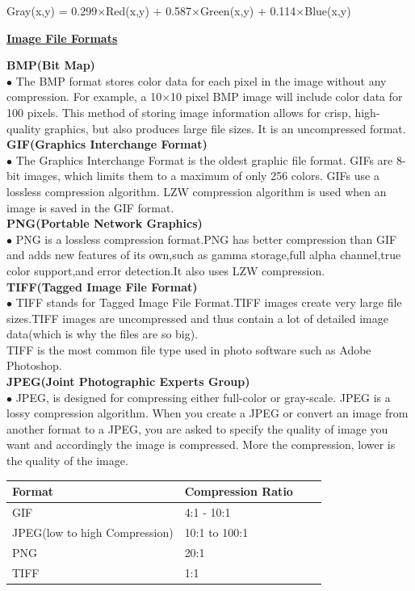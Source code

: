 \documentclass[10pt,a4paper]{article}
\begin{document}
Gray(x,y) = 0.299$\times$Red(x,y) + 0.587$\times$Green(x,y) + 0.114$\times$Blue(x,y)
\begin{center}
\underline{\textbf{Image File Formats}} 
\end{center}
\textbf{BMP(Bit Map)}\\
$\bullet$ The BMP format stores color data for each pixel in the image without any compression. For example, a 10$\times$10 pixel BMP image will include color data for 100 pixels. This method of storing image information allows for crisp, high-quality graphics, but also produces large file sizes.
It is an uncompressed format.\\
\textbf{GIF(Graphics Interchange Format)}\\
$\bullet$ The Graphics Interchange Format is the oldest graphic file format.  GIFs are 8-bit images, which limits them to a maximum of only 256 colors. GIFs use a lossless compression algorithm. LZW compression algorithm is used when an image is saved in the GIF format.\\
\textbf{PNG(Portable Network Graphics)}\\
$\bullet$ PNG is a lossless compression format.PNG has better compression than GIF and adds new features of its own,such as gamma storage,full alpha channel,true color support,and error detection.It also uses LZW compression.\\
\textbf{TIFF(Tagged Image File Format)}\\
$\bullet$ TIFF stands for Tagged Image File Format.TIFF images create very large file sizes.TIFF images are uncompressed and thus contain a lot of detailed image data(which is why the files are so big).\\
TIFF is the most common file type used in photo software such as Adobe Photoshop.\\
\textbf{JPEG(Joint Photographic Experts Group)}\\
$\bullet$ JPEG, is designed for compressing either full-color or gray-scale. JPEG is a lossy compression algorithm.  When you create a JPEG or convert an image from another format to a JPEG, you are asked to specify the quality of image you want and accordingly the image is compressed. More the compression, lower is the quality of the image.\\	
		
\begin{center}
    \begin{tabular}{ | l | l | l | p{5cm} |}
    \hline
    \textbf{Format} & \textbf{Compression Ratio} \\ \hline
    GIF & 4:1 - 10:1 \\ \hline
    JPEG(low to high Compression) & 10:1 to 100:1\\ \hline
    PNG & 20:1 \\
    \hline
    TIFF & 1:1\\
    \hline
    \end{tabular}
\end{center}
\end{document}
